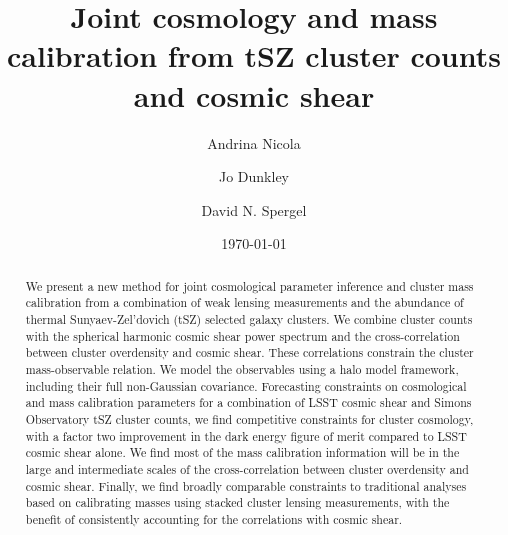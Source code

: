 \documentclass[%
 reprint,
nofootinbib,
 amsmath,amssymb,
 aps,
]{revtex4-1}
\begin{document}

\title{Joint cosmology and mass calibration from tSZ cluster counts and cosmic shear}%

\author{Andrina Nicola}
\author{Jo Dunkley}
\author{David N. Spergel}


\date{\today}%

\begin{abstract}
We present a new method for joint cosmological parameter inference and cluster mass calibration from a combination of weak lensing measurements and the abundance of thermal Sunyaev-Zel'dovich (tSZ) selected galaxy clusters. We combine cluster counts with the spherical harmonic cosmic shear power spectrum and the cross-correlation between cluster overdensity and cosmic shear. These correlations constrain the cluster mass-observable relation. We model the observables using a halo model framework, including their full non-Gaussian covariance. Forecasting constraints on cosmological and mass calibration parameters for a combination of LSST cosmic shear and Simons Observatory tSZ cluster counts, we find competitive constraints for cluster cosmology, with a factor two improvement in the dark energy figure of merit compared to LSST cosmic shear alone. We find most of the mass calibration information will be in the large and intermediate scales of the cross-correlation between cluster overdensity and cosmic shear. Finally, we find broadly comparable constraints to traditional analyses based on calibrating masses using stacked cluster lensing measurements, with the benefit of consistently accounting for the correlations with cosmic shear. 
\end{abstract}

\maketitle
\end{document}

